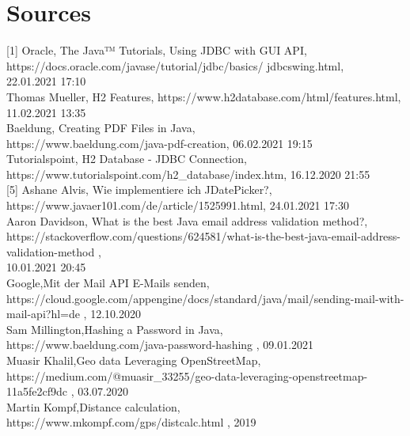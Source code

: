 \documentclass[a4paper, 12pt]{report}
\begin{document}
\chapter{Sources}

[1] Oracle, The Java™ Tutorials, Using JDBC with GUI API,\\
https://docs.oracle.com/javase/tutorial/jdbc/basics/		jdbcswing.html, \\22.01.2021 17:10 \\\relax
[2] Thomas Mueller, H2 Features, https://www.h2database.com/html/features.html,\\ 11.02.2021 13:35 \\\relax
[3] Baeldung, Creating PDF Files in Java, \\https://www.baeldung.com/java-pdf-creation, 06.02.2021 19:15 \\\relax
[4] Tutorialspoint, H2 Database - JDBC Connection, \\https://www.tutorialspoint.com/h2_database/index.htm, 16.12.2020 21:55 \\\relax
[5] Ashane Alvis, Wie implementiere ich JDatePicker?, \\https://www.javaer101.com/de/article/1525991.html, 24.01.2021 17:30 \\\relax
[6] Aaron Davidson, What is the best Java email address validation method?, \\https://stackoverflow.com/questions/624581/what-is-the-best-java-email-address-validation-method , \\10.01.2021 20:45 \\\relax
[7]Google,Mit der Mail API E-Mails senden, \\https://cloud.google.com/appengine/docs/standard/java/mail/sending-mail-with-mail-api?hl=de , 12.10.2020\\\relax
[8]Sam Millington,Hashing a Password in Java,\\https://www.baeldung.com/java-password-hashing , 09.01.2021 \\\relax
[9]Muasir Khalil,Geo data Leveraging OpenStreetMap,\\https://medium.com/@muasir_33255/geo-data-leveraging-openstreetmap-11a5fe2cf9dc , 03.07.2020\\\relax
[10]Martin Kompf,Distance calculation,\\https://www.mkompf.com/gps/distcalc.html , 2019
\end{document}
